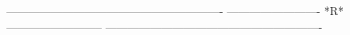  
 
 
 
 
 
 
 
 
 
 
 
 
 
 
 
 
 
 
 
 
 
 
 
 
 
 
 
 
 
 
 
 
 
 
 
 
 
 
 
 
 
 
 
 
 
 
 
 
 
 
 
 
 
 
 
 
 
 
 
 
 
 
 
 
 
 
 
 
 
 
 
 
 
 
 
 
 
----------------------------------------------------------
-------------------------  *R*  --------------------------
----------------------------------------------------------
 
 
 
 
 
 
 
 
 
 
 
 
 
 
 
 
 
 
 
 
 
 
 
 
 
 
 
 
 
 
 
 
 
